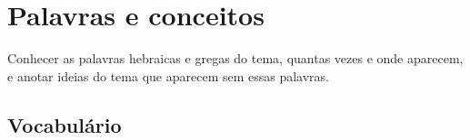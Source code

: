 \chapter{Palavras e conceitos}

\begin{objetivo}
Conhecer as palavras hebraicas e gregas do tema, quantas vezes e onde
aparecem, e anotar ideias do tema que aparecem sem essas palavras.
\end{objetivo}

\section{Vocabulário}
\vocabulariodotema

